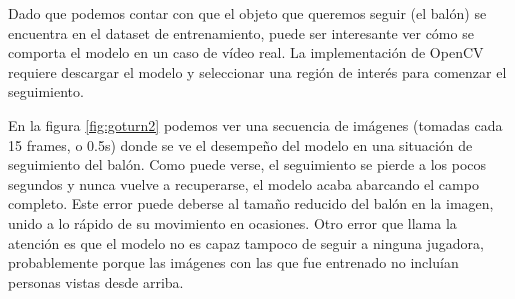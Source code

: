 Dado que podemos contar con que el objeto que queremos seguir (el balón) se encuentra en el dataset de entrenamiento, puede ser interesante ver cómo se comporta el modelo en un caso de vídeo real. La implementación de OpenCV requiere descargar el modelo y seleccionar una región de interés para comenzar el seguimiento.

En la figura \ref{fig:goturn2} podemos ver una secuencia de imágenes (tomadas cada 15 frames, o 0.5s) donde se ve el desempeño del modelo en una situación de seguimiento del balón. Como puede verse, el seguimiento se pierde a los pocos segundos y nunca vuelve a recuperarse, el modelo acaba abarcando el campo completo. Este error puede deberse al tamaño reducido del balón en la imagen, unido a lo rápido de su movimiento en ocasiones. Otro error que llama la atención es que el modelo no es capaz tampoco de seguir a ninguna jugadora, probablemente porque las imágenes con las que fue entrenado no incluían personas vistas desde arriba.

